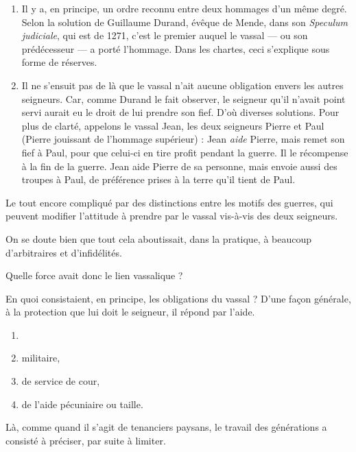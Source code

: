 \documentclass[french,twoside]{book} %
\newcommand{\labelchar}[1]{{\color{rubric}\bf #1}}
\begin{document}
\begin{enumerate}[itemsep=0pt,]
\item Il y a, en principe, un ordre reconnu entre deux hommages d’un même degré. Selon la solution de Guillaume Durand, évêque de Mende, dans son {\itshape Speculum judiciale}, qui est de 1271, c’est le premier auquel le vassal — ou son prédécesseur — a porté l’hommage. Dans les chartes, ceci s’explique sous forme de réserves.
\item Il ne s’ensuit pas de là que le vassal n’ait aucune obligation envers les autres seigneurs. Car, comme Durand le fait observer, le seigneur qu’il n’avait point servi aurait eu le droit de lui prendre son fief. D’où diverses solutions. Pour plus de clarté, appelons le vassal Jean, les deux seigneurs Pierre et Paul (Pierre jouissant de  
\label{p66} l’hommage supérieur) : Jean \emph{aide} Pierre, mais remet son fief à Paul, pour que celui-ci en tire profit pendant la guerre. Il le récompense à la fin de la guerre. Jean aide Pierre de sa personne, mais envoie aussi des troupes à Paul, de préférence prises à la terre qu’il tient de Paul.

\end{enumerate}\noindent Le tout encore compliqué par des distinctions entre les motifs des guerres, qui peuvent modifier l’attitude à prendre par le vassal vis-à-vis des deux seigneurs.\par
On se doute bien que tout cela aboutissait, dans la pratique, à beaucoup d’arbitraires et d’infidélités.\par
\bigbreak
\noindent \labelchar{d)} Quelle force avait donc le lien vassalique ?\par
En quoi consistaient, en principe, les obligations du vassal ? D’une façon générale, à la protection que lui doit le seigneur, il répond par l’aide.\par

\begin{enumerate}[itemsep=0pt,]
\item[] \hspace{-1.5em}{\bfseries Cette aide prend la forme :}
\item militaire,
\item de service de cour,
\item de l’aide pécuniaire ou taille.

\end{enumerate}\noindent Là, comme quand il s’agit de tenanciers paysans, le travail des générations a consisté à préciser, par suite à limiter.\par
\end{document}
